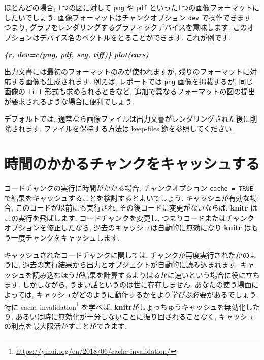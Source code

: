 \documentclass[
  11pt,
  lualatex,ja=standard,jafont=noto]{bxjsreport}
\newenvironment{Shaded}{\begin{snugshade}}{\end{snugshade}}
\newcommand{\InformationTok}[1]{\textcolor[rgb]{0.56,0.35,0.01}{\textbf{\textit{#1}}}}
\renewcommand{\href}[2]{#2\footnote{\url{#1}}}
\begin{document}
ほとんどの場合, 1つの図に対して \texttt{png} や \texttt{pdf} といった1つの画像フォーマットにしたいでしょう. 画像フォーマットはチャンクオプション \texttt{dev} で操作できます. つまり, グラフをレンダリングするグラフィックデバイスを意味します. このオプションはデバイス名のベクトルをとることができます. これが例です.

\begin{Shaded}
\begin{Highlighting}[]
\InformationTok{\textasciigrave{}\textasciigrave{}\textasciigrave{}\{r, dev=c(\textquotesingle{}png\textquotesingle{}, \textquotesingle{}pdf\textquotesingle{}, \textquotesingle{}svg\textquotesingle{}, \textquotesingle{}tiff\textquotesingle{})\}}
\InformationTok{plot(cars)}
\InformationTok{\textasciigrave{}\textasciigrave{}\textasciigrave{}}
\end{Highlighting}
\end{Shaded}

出力文書には最初のフォーマットのみが使われますが, 残りのフォーマットに対応する画像も生成されます. 例えば, レポートでは \texttt{png} 画像を掲載するが, 同じ画像の \texttt{tiff} 形式も求められるときなど, 追加で異なるフォーマットの図の提出が要求されるような場合に便利でしょう.

デフォルトでは, 通常なら画像ファイルは出力文書がレンダリングされた後に削除されます. ファイルを保持する方法は\ref{keep-files}節を参照してください.

\hypertarget{cache}{%
\section{時間のかかるチャンクをキャッシュする}\label{cache}}

コードチャンクの実行に時間がかかる場合, チャンクオプション \texttt{cache = TRUE} で結果をキャッシュすることを検討するとよいでしょう. キャッシュが有効な場合, このコードが以前にも実行され, その後コードに変更がないならば, \textbf{knitr} はこの実行を飛ばします. コードチャンクを変更し, つまりコードまたはチャンクオプションを修正したなら, 過去のキャッシュは自動的に無効になり \textbf{knitr} はもう一度チャンクをキャッシュします.

キャッシュされたコードチャンクに関しては, チャンクが再度実行されたかのように, 過去の実行結果から出力とオブジェクトが自動的に読み込まれます. キャッシュを読み込むほうが結果を計算するよりはるかに速いという場合に役に立ちます. しかしながら, うまい話というのは世に存在しません. あなたの使う場面によっては, キャッシュがどのように動作するかをより学びぶ必要があるでしょう. 特に \href{https://yihui.org/en/2018/06/cache-invalidation/}{cache invalidation} を学べば, \textbf{knitr}がしょっちゅうキャッシュを無効化したり, あるいは時に無効化が十分しないことに振り回されることなく, キャッシュの利点を最大限活かすことができます.
\end{document}
